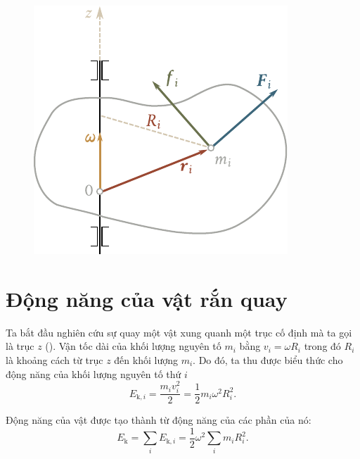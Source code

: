 \begin{figure}[!htb]
	\begin{center}
		\includegraphics[scale=1]{figures/ch_05/fig_5_19.pdf}
		\caption[]{}
		\label{fig:5_19}
	\end{center}
\end{figure}

\section{Động năng của vật rắn quay}\label{sec:5_6}

Ta bắt đầu nghiên cứu sự quay một vật xung quanh một trục cố định mà ta gọi là trục $z$ (). Vận tốc dài của khối lượng nguyên tố $m_i$ bằng $v_i=\omega R_i$ trong đó $R_i$ là khoảng cách từ trục $z$ đến khối lượng $m_i$. Do đó, ta thu được biểu thức cho động năng của khối lượng nguyên tố thứ $i$
\begin{equation*}
	E_{\text{k},i} = \frac{m_i v_i^2}{2} = \frac{1}{2}m_i \omega^2 R_i^2.
\end{equation*}

\noindent
Động năng của vật được tạo thành từ động năng của các phần của nó:
\begin{equation*}
	E_{\text{k}} = \sum_i E_{\text{k},i} = \frac{1}{2}\omega^2 \sum_i m_i R_i^2.
\end{equation*}


